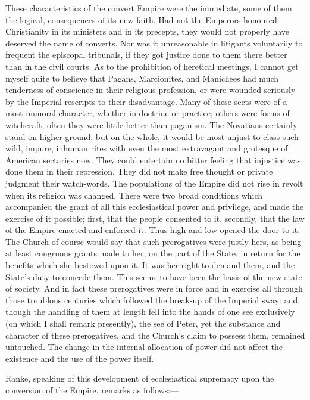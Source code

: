 These characteristics of the convert Empire were the immediate, some
of them the logical, consequences of its new faith. Had not the Emperors
honoured Christianity in its ministers and in its precepts, they would
not properly have deserved the name of converts. Nor was it unreasonable
in litigants voluntarily to frequent the episcopal tribunals, if they
got justice done to them there better than in the civil courts. As to
the prohibition of heretical meetings, I cannot get myself quite to
believe that Pagans, Marcionites, and Manichees had much tenderness of
conscience in their religious profession, or were wounded seriously by
the Imperial rescripts to their disadvantage. Many of these sects were
of a most immoral character, whether in doctrine or practice; others
were forms of witchcraft; often they were little better than paganism.
The Novatians certainly stand on higher ground; but on the whole, it
would be most unjust to class such wild, impure, inhuman rites with even
the most extravagant and grotesque of American sectaries now. They could
entertain no bitter feeling that injustice was done them in their
repression. They did not make free thought or private judgment their
watch-words. The populations of the Empire did not rise in revolt when
its religion was changed. There were two broad conditions which
accompanied the grant of all this ecclesiastical power and privilege,
and made the exercise of it possible; first, that the people consented
to it, secondly, that the law of the Empire enacted and enforced
it. Thus high and low opened the door to it. The Church of course would
say that such prerogatives were justly hers, as being at least congruous
grants made to her, on the part of the State, in return for the benefits
which she bestowed upon it. It was her right to demand them, and the
State's duty to concede them. This seems to have been the basis of the
new state of society. And in fact these prerogatives were in force and
in exercise all through those troublous centuries which followed the
break-up of the Imperial sway: and, though the handling of them at
length fell into the hands of one see exclusively (on which I shall
remark presently), the see of Peter, yet the substance and character of
these prerogatives, and the Church's claim to possess them, remained
untouched. The change in the internal allocation of power did not affect
the existence and the use of the power itself.

Ranke, speaking of this development of ecclesiastical supremacy upon
the conversion of the Empire, remarks as follows:—

